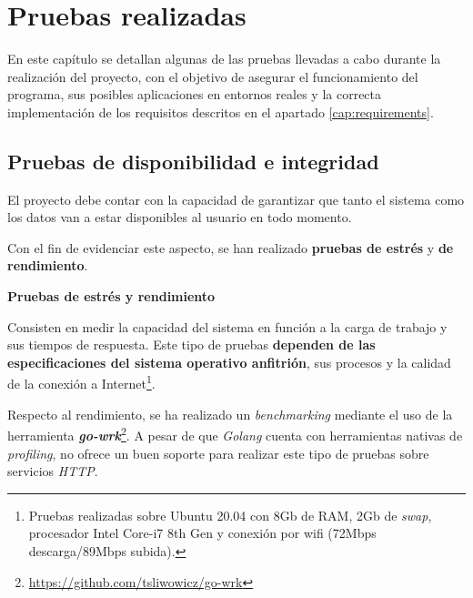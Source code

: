 

\chapter{Pruebas realizadas} \label{cap:tests}

En este capítulo se detallan algunas de las pruebas llevadas a cabo durante la realización del proyecto, con el objetivo de asegurar el funcionamiento del programa, sus posibles aplicaciones en entornos reales y la correcta implementación de los requisitos descritos en el apartado \ref{cap:requirements}.\n


\section{Pruebas de disponibilidad e integridad} \label{sec:disptest}

El proyecto debe contar con la capacidad de garantizar que tanto el sistema como los datos van a estar disponibles al usuario en todo momento.\sn

Con el fin de evidenciar este aspecto, se han realizado \textbf{pruebas de estrés} y \textbf{de rendimiento}.\sn

\large
\textbf{Pruebas de estrés y rendimiento}\sn
\normalsize

Consisten en medir la capacidad del sistema en función a la carga de trabajo y sus tiempos de respuesta. Este tipo de pruebas \textbf{dependen de las especificaciones del sistema operativo anfitrión}, sus procesos y la calidad de la conexión a Internet\footnote{Pruebas realizadas sobre Ubuntu 20.04 con 8Gb de RAM, 2Gb de \textit{swap}, procesador Intel Core-i7 8th Gen y conexión por wifi (72Mbps descarga/89Mbps subida).}.\sn

Respecto al rendimiento, se ha realizado un \textit{benchmarking} mediante el uso de la herramienta \textbf{\textit{go-wrk}}\footnote{\url{https://github.com/tsliwowicz/go-wrk}}. A pesar de que \textit{Golang} cuenta con herramientas nativas de \textit{profiling}, no ofrece un buen soporte para realizar este tipo de pruebas sobre servicios \textit{HTTP}.\sn

